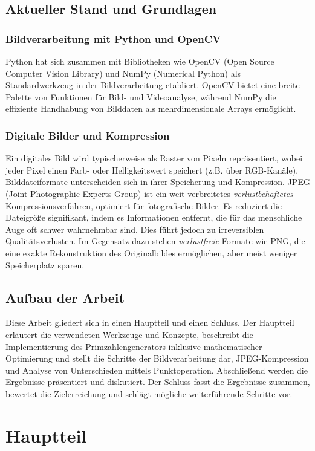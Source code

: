 \documentclass[titlepage]{article}
\begin{document}
\subsection{Aktueller Stand und Grundlagen}
\subsubsection{Bildverarbeitung mit Python und OpenCV}
Python hat sich zusammen mit Bibliotheken wie OpenCV (Open Source Computer Vision Library) und NumPy (Numerical Python) als Standardwerkzeug in der Bildverarbeitung etabliert. OpenCV bietet eine breite Palette von Funktionen für Bild- und Videoanalyse, während NumPy die effiziente Handhabung von Bilddaten als mehrdimensionale Arrays ermöglicht.

\subsubsection{Digitale Bilder und Kompression}
Ein digitales Bild wird typischerweise als Raster von Pixeln repräsentiert, wobei jeder Pixel einen Farb- oder Helligkeitswert speichert (z.B. über RGB-Kanäle). Bilddateiformate unterscheiden sich in ihrer Speicherung und Kompression. JPEG (Joint Photographic Experts Group) ist ein weit verbreitetes \textit{verlustbehaftetes} Kompressionsverfahren, optimiert für fotografische Bilder. Es reduziert die Dateigröße signifikant, indem es Informationen entfernt, die für das menschliche Auge oft schwer wahrnehmbar sind. Dies führt jedoch zu irreversiblen Qualitätsverlusten. Im Gegensatz dazu stehen \textit{verlustfreie} Formate wie PNG, die eine exakte Rekonstruktion des Originalbildes ermöglichen, aber meist weniger Speicherplatz sparen.

\subsection{Aufbau der Arbeit}
Diese Arbeit gliedert sich in einen Hauptteil und einen Schluss. Der Hauptteil erläutert die verwendeten Werkzeuge und Konzepte, beschreibt die Implementierung des Primzahlengenerators inklusive mathematischer Optimierung und stellt die Schritte der Bildverarbeitung dar, JPEG-Kompression und Analyse von Unterschieden mittels Punktoperation. Abschließend werden die Ergebnisse präsentiert und diskutiert. Der Schluss fasst die Ergebnisse zusammen, bewertet die Zielerreichung und schlägt mögliche weiterführende Schritte vor.


\section{Hauptteil}
\end{document}
